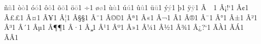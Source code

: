 {        {^^f1}{{\textcolor{gray}{\~{n}}}}1  %
        {^^f2}{{\textcolor{gray}{\`{o}}}}1  %
        {^^f3}{{\textcolor{gray}{\'{o}}}}1  %
        {^^f4}{{\textcolor{gray}{\^{o}}}}1  %
        {^^f5}{{\textcolor{gray}{\~{o}}}}1  %
        {^^f6}{{\textcolor{gray}{\"{o}}}}1  %
        {^^f7}{{\textcolor{gray}{\textdiv}}}1  %
        {^^f8}{{\textcolor{gray}{\o}}}1  %
        {^^f9}{{\textcolor{gray}{\`{u}}}}1  %
        {^^fa}{{\textcolor{gray}{\'{u}}}}1  %
        {^^fb}{{\textcolor{gray}{\^{u}}}}1  %
        {^^fc}{{\textcolor{gray}{\"{u}}}}1  %
        {^^fd}{{\textcolor{gray}{\'{y}}}}1  %
        {^^fe}{{\textcolor{gray}{\th}}}1  %
        {^^ff}{{\textcolor{gray}{\"{y}}}}1  %
        {^^c2^^a0}{{~}}1  %
        {^^c2^^a1}{{!`}}1  %
        {^^c2^^a2}{{\textcent}}1  %
        {^^c2^^a3}{{\pounds}}1  %
        {^^c2^^a4}{{\textcurrency}}1  %
        {^^c2^^a5}{{\textyen}}1  %
        {^^c2^^a6}{{\textbrokenbar}}1  %
        {^^c2^^a7}{{\S}}1  %
        {^^c2^^a8}{{\textasciidieresis}}1  %
        {^^c2^^a9}{{\copyright}}1  %
        {^^c2^^aa}{{\textordfeminine}}1  %
        {^^c2^^ab}{{\guillemotleft}}1  %
        {^^c2^^ac}{{\textlnot}}1  %
        {^^c2^^ad}{{\-}}1  %
        {^^c2^^ae}{{\textregistered}}1  %
        {^^c2^^af}{{\textasciimacron}}1  %
        {^^c2^^b0}{{\textdegree}}1  %
        {^^c2^^b1}{{\textpm}}1  %
        {^^c2^^b2}{{\texttwosuperior}}1  %
        {^^c2^^b3}{{\textthreesuperior}}1  %
        {^^c2^^b4}{{\textasciiacute}}1  %
        {^^c2^^b5}{{\textmu}}1  %
        {^^c2^^b6}{{\P}}1  %
        {^^c2^^b7}{{\textperiodcentered}}1  %
        {^^c2^^b8}{{\c{}}}1  %
        {^^c2^^b9}{{\textonesuperior}}1  %
        {^^c2^^ba}{{\textordmasculine}}1  %
        {^^c2^^bb}{{\guillemotright}}1  %
        {^^c2^^bc}{{\textonequarter}}1  %
        {^^c2^^bd}{{\textonehalf}}1  %
        {^^c2^^be}{{\textthreequarters}}1  %
        {^^c2^^bf}{{?`}}1  %
        {^^c3^^80}{{\`{A}}}1  %
        {^^c3^^81}{{\'{A}}}1  %
        {^^c3^^82}{{\^{A}}}1  %
}
